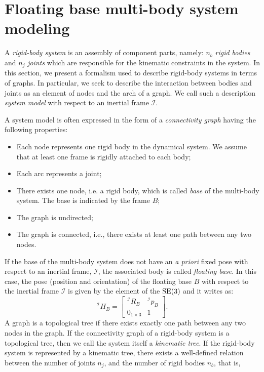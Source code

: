 \section{Floating base multi-body system modeling\label{sec:floating-base-multi-body-system}}
A \emph{rigid-body system} is an assembly of component parts, namely: $n_b$ \emph{rigid bodies} and $n_j$ \emph{joints} which are responsible for the kinematic constraints in the system. In this section, we present a formalism used to describe rigid-body systems in terms of graphs. In particular, we seek to describe the interaction between bodies and joints as an element of nodes and the arch of a graph. We call such a description \emph{system model} with respect to an inertial frame $\mathcal{I}$. 
\par
A system model is often expressed in the form of a \emph{connectivity graph} having the following properties:
\begin{itemize}
    \item Each node represents one rigid body in the dynamical system. We assume that at least one frame is rigidly attached to each body; 
    \item Each arc represents a joint;
    \item There exists one node, i.e. a rigid body, which is called \emph{base} of the multi-body system. The base is indicated by the frame $B$;
    \item The graph is undirected;
    \item The graph is connected, i.e., there exists at least one path between any two nodes. 
\end{itemize}
If the base of the multi-body system does not have an \emph{a priori} fixed pose with respect to an inertial frame, $\mathcal{I}$, the associated body is called \emph{floating base}. In this case, the pose (position and orientation) of the floating base $B$ with respect to the inertial frame $\mathcal{I}$ is given by the element of the ${\mathrm{SE}}(3)$ and it writes as:
\begin{equation}
\label{eq:base-pose}
{}^\mathcal{I} H _B = \begin{bmatrix}
{}^\mathcal{I} R _B & {}^\mathcal{I} p _B \\
{0}_{1 \times 3} & 1
\end{bmatrix}.
\end{equation}
A graph is a topological tree if there exists exactly one path between any two
nodes in the graph. If the connectivity graph of a rigid-body system is a topological tree, then we call the system itself a \emph{kinematic tree}. If the rigid-body system is represented by a kinematic tree, there exists a well-defined relation between the number of joints $n_j$, and the number of rigid bodies $n_b$, that is,
